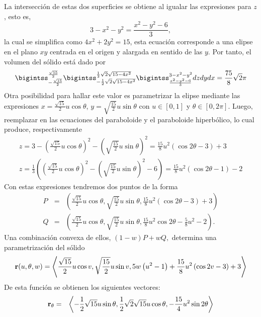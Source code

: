 \begin{enumerate}[leftmargin=0cm,itemindent=.75cm,labelwidth=\itemindent,labelsep=0cm,align=left,label={{\bf \arabic*)}}]
La intersecci\'{o}n de estas dos superficies se obtiene al igualar las expresiones para $z$, esto es, 
$$3-x^{2}-y^{2}=\frac{x^{2}-y^{2}-6}{3},$$
la cual se simplifica como $4x^2+2y^2=15$, esta ecuación corresponde a una elipse en el plano $xy$ centrada en el origen y alargada en sentido de las $y.$
Por tanto, el volumen del s\'{o}lido est\'{a} dado por
\begin{equation} \label{ejercicio4}
\bigintss_{-\frac{\sqrt{15}}{2}}^{\frac{\sqrt{15}}{2}}\bigintss_{-\frac{1}{2}\sqrt{2} \sqrt{15-4x^{2}}}^{\frac{1}{2}\sqrt{2}\sqrt{15-4x^{2}}}\bigintss_{\frac{x^{2}-y^{2}-6}{3}}^{3-x^{2}-y^{2}}dzdydx= \frac{75}{8}\sqrt{2}\pi
\end{equation}
Otra posibilidad para hallar este valor es parametrizar la elipse mediante las expresiones
$x=\frac{\sqrt{15}}{2}u\cos \theta $, $y=\sqrt{\frac{15}{2}}u\sin \theta $ con $u \in [0,1]$ y $\theta \in [0,2\pi].$
Luego, reemplazar en las ecuaciones del paraboloide y el paraboloide hiperbólico, lo cual produce, respectivamente
\begin{multline*}
z = 3-\left( \frac{\sqrt{15}}{2}u\cos \theta \right)
^2 -\left( \sqrt{\frac{15}{2}}u\sin \theta \right) ^2  = \frac{15}{8}u^{2}(\cos 2\theta -3)+3 \\
z =  \frac{1}{3}\left( \left( \frac{\sqrt{15}}{2}u\cos \theta \right)^2 
-\left( \sqrt{\frac{15}{2}}u\sin \theta \right) ^2 -6\right) =  \frac{15}{8}u^{2}(\cos 2\theta -1)-2 
\end{multline*}
Con estas expresiones tendremos dos puntos de la forma 
\begin{eqnarray*}
P& =&\left( \frac{\sqrt{15}}{2}u\cos \theta,\sqrt{\frac{15}{2}}u\sin \theta , \frac{15}{8}u^{2}(\cos 2\theta -3)+3\right) \\
Q&=&\left( \frac{\sqrt{15}}{2}u\cos \theta,\sqrt{\frac{15}{2}}u\sin \theta,\frac{15}{8}u^{2}\cos 2\theta-\frac{5}{8}u^{2}-2\right).
\end{eqnarray*}
Una combinación convexa de ellos, $(1-w)P+wQ,$ determina una parametrización del sólido
$$ {\bf r}(u,\theta,w) = \left\langle \frac{\sqrt{15}}{2}u\cos v,\sqrt{\frac{15}{2}}u\sin v,5w\left( u^{2}-1\right) +\frac{15}{8}u^{2}\left(
\cos 2v-3\right) +3 \right\rangle $$
De esta función se obtienen los siguientes vectores:
\begin{eqnarray*}
{\bf r}_{\theta } &=&\left\langle -\frac{1}{2}\sqrt{15}u\sin \theta ,\frac{1}{2}%
\sqrt{2}\sqrt{15}u\cos \theta ,-\frac{15}{4}u^{2}\sin 2\theta \right\rangle \end{eqnarray*}


\end{enumerate}
